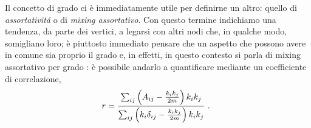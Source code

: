 Il concetto di grado ci è immediatamente utile per definirne un altro: quello di \emph{assortativit\'{a}} o di \emph{mixing assortativo}.
 Con questo termine indichiamo una tendenza, da parte dei vertici, a legarsi con altri nodi che, in qualche modo, somigliano loro; è piuttosto immediato pensare che un aspetto che possono avere in comune sia proprio il grado e, in effetti, in questo contesto si parla di mixing assortativo per grado \cite{Newman}: è possibile andarlo a quantificare mediante un coefficiente di correlazione,
\begin{equation}
	r = \frac{ \sum_{ij} \left( A_{ij} - \frac{k_i k_j}{2m} \right) k_i k_j}{\sum_{ij} \left(k_i \delta_{ij} - \frac{k_i k_j}{2m} \right) k_i k_j} $ . $
\end{equation}

